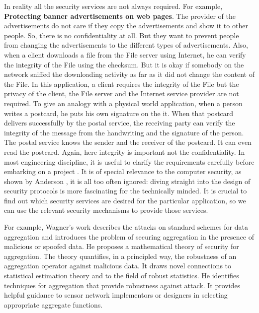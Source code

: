 	In reality all the security services are not always required.
	For example, \textbf{Protecting banner advertisements on web pages}. 
	The provider of the advertisements do not care if they copy the advertisements and show it to other people.
	So, there is no confidentiality at all.
	But they want to prevent people from changing the advertisements to the different types of advertisements.
	Also, when a client downloads a file from the File server using Internet, he can verify the integrity of the File using the checksum.
	But it is okay if somebody on the network sniffed the downloading activity as far as it did not change the content of the File.
	In this application, a client requires the integrity of the File but the privacy of the client, the File server and the Internet service provider are not required.
	To give an analogy with a physical world application, when a person writes a postcard, he puts his own signature on the it. 
	When that postcard delivers successfully by the postal service, the receiving party can verify the integrity of the message from the handwriting and the signature of the person.
	The postal service knows the sender and the receiver of the postcard.
	It can even read the postcard.
	Again, here integrity is important not the confidentiality.
	In most engineering discipline, it is useful to clarify the requirements carefully before embarking on a project \cite{2002-Stajano-ubiquitous}.
	It is of special relevance to the computer security, as shown by Anderson \cite{anderson1993cryptosystems}, it is all too often ignored: diving straight into the design of security protocols is more fascinating for the technically minded.
 	It is crucial to find out which security services are desired for the particular application, so we can use the relevant security mechanisms to provide those services.
	

	For example, Wagner's work \cite{wagner2004resilient} describes the attacks on standard schemes for data aggregation and introduces the problem of securing aggregation in the presence of malicious or spoofed data.
	He proposes a mathematical theory of security for aggregation.
	The theory quantifies, in a principled way, the robustness of an aggregation operator against malicious data.
	It draws novel connections to statistical estimation theory and to the field of robust statistics.
	He identifies techniques for aggregation that provide robustness against attack. 
	It provides helpful guidance to sensor network implementors or designers in selecting appropriate aggregate functions.

